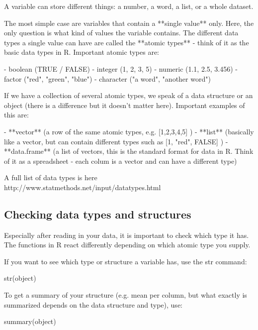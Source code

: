 \documentclass[a4paper,twoside]{tufte-book}\usepackage[]{graphicx}\usepackage[]{color}
\begin{document}
\begin{appendices}
A variable can store different things: a number, a word, a list, or a whole dataset. 

The most simple case are variables that contain a **single value** only. Here, the only question is what kind of values the variable contains. The different data types a single value can have are called the **atomic types** - think of it as the basic data types in R. Important atomic types are: 

- boolean (TRUE / FALSE)
- integer (1, 2, 3, 5)
- numeric (1.1, 2.5, 3.456)
- factor ("red", "green", "blue")
- character ("a word", "another word")

If we have a collection of several atomic types, we speak of a data structure or an object (there is a difference but it doesn't matter here). Important examples of this are: 

- **vector** (a row of the same atomic types, e.g. [1,2,3,4,5] )
- **list** (basically like a vector, but can contain different types such as [1, "red", FALSE] )
- **data.frame** (a list of vectors, this is the standard format for data in R. Think of it as a spreadsheet - each colum is a vector and can have a different type)

A full list of data types is here http://www.statmethods.net/input/datatypes.html 
 
\subsection{Checking data types and structures}

Especially after reading in your data, it is important to check which type it has. The functions in R react differently depending on which atomic type you supply. 

If you want to see which type or structure a variable has, use the str command:

\begin{Schunk}
\begin{Sinput}
str(object)
\end{Sinput}
\end{Schunk}

To get a summary of your structure (e.g. mean per column, but what exactly is summarized depends on the data structure and type), use:

\begin{Schunk}
\begin{Sinput}
summary(object)
\end{Sinput}
\end{Schunk}


\end{appendices}
\end{document}
